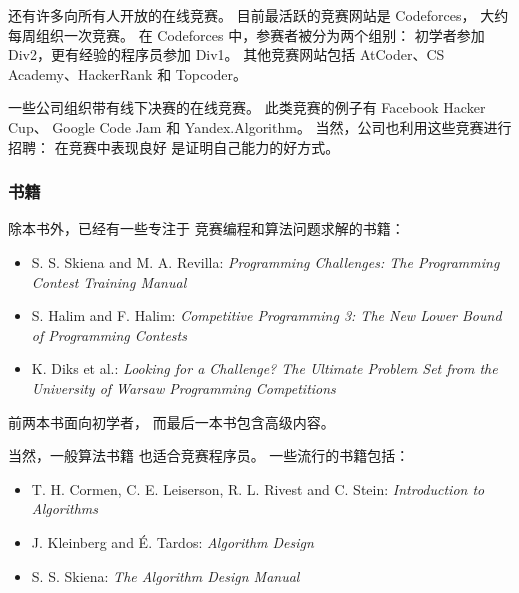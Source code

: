 还有许多向所有人开放的在线竞赛。
目前最活跃的竞赛网站是 Codeforces，
大约每周组织一次竞赛。
在 Codeforces 中，参赛者被分为两个组别：
初学者参加 Div2，更有经验的程序员参加 Div1。
其他竞赛网站包括 AtCoder、CS Academy、HackerRank 和 Topcoder。

一些公司组织带有线下决赛的在线竞赛。
此类竞赛的例子有 Facebook Hacker Cup、
Google Code Jam 和 Yandex.Algorithm。
当然，公司也利用这些竞赛进行招聘：
在竞赛中表现良好
是证明自己能力的好方式。

\subsubsection{书籍}

除本书外，已经有一些专注于
竞赛编程和算法问题求解的书籍：

\begin{itemize}
\item S. S. Skiena and M. A. Revilla:
\emph{Programming Challenges: The Programming Contest Training Manual} \cite{ski03}
\item S. Halim and F. Halim:
\emph{Competitive Programming 3: The New Lower Bound of Programming Contests} \cite{hal13}
\item K. Diks et al.: \emph{Looking for a Challenge? The Ultimate Problem Set from
the University of Warsaw Programming Competitions} \cite{dik12}
\end{itemize}

前两本书面向初学者，
而最后一本书包含高级内容。

当然，一般算法书籍
也适合竞赛程序员。
一些流行的书籍包括：

\begin{itemize}
\item T. H. Cormen, C. E. Leiserson, R. L. Rivest and C. Stein:
\emph{Introduction to Algorithms} \cite{cor09}
\item J. Kleinberg and É. Tardos:
\emph{Algorithm Design} \cite{kle05}
\item S. S. Skiena:
\emph{The Algorithm Design Manual} \cite{ski08}
\end{itemize}

